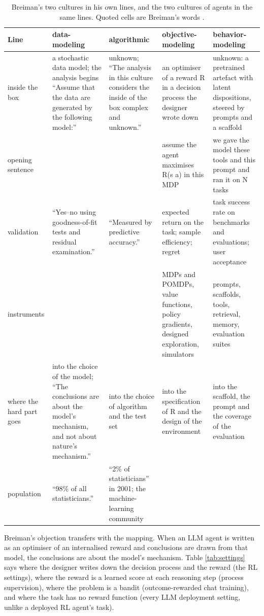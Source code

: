 \documentclass{article}
\begin{document}
\begin{table}[!htb]
\centering\small\setlength{\tabcolsep}{3pt}
\caption{Breiman's two cultures in his own lines, and the two cultures of agents in the same lines. Quoted cells are Breiman's words \citep{breiman2001}.}\label{tab:cultures}
\begin{tabularx}{\textwidth}{@{}>{\raggedright\arraybackslash}X>{\raggedright\arraybackslash}X>{\raggedright\arraybackslash}X>{\raggedright\arraybackslash}X>{\raggedright\arraybackslash}X@{}}
\toprule
Line & data-modeling & algorithmic & objective-modeling & behavior-modeling \\
\midrule
inside the box & a stochastic data model; the analysis begins ``Assume that the data are generated by the following model:'' & unknown; ``The analysis in this culture considers the inside of the box complex and unknown.'' & an optimiser of a reward R in a decision process the designer wrote down & unknown: a pretrained artefact with latent dispositions, steered by prompts and a scaffold \\
opening sentence &  &  & assume the agent maximises R(s a) in this MDP & we gave the model these tools and this prompt and ran it on N tasks \\
validation & ``Yes--no using goodness-of-fit tests and residual examination.'' & ``Measured by predictive accuracy.'' & expected return on the task; sample efficiency; regret & task success rate on benchmarks and evaluations; user acceptance \\
instruments &  &  & MDPs and POMDPs, value functions, policy gradients, designed exploration, simulators & prompts, scaffolds, tools, retrieval, memory, evaluation suites \\
where the hard part goes & into the choice of the model; ``The conclusions are about the model's mechanism, and not about nature's mechanism.'' & into the choice of algorithm and the test set & into the specification of R and the design of the environment & into the scaffold, the prompt and the coverage of the evaluation \\
population & ``98\% of all statisticians.'' & ``2\% of statisticians'' in 2001; the machine-learning community &  &  \\
\bottomrule
\end{tabularx}
\end{table}

Breiman's objection transfers with the mapping. When an LLM agent is written as an optimiser of an internalised reward and conclusions are drawn from that model, the conclusions are about the model's mechanism. Table \ref{tab:settings} says where the designer writes down the decision process and the reward (the RL settings), where the reward is a learned score at each reasoning step (process supervision), where the problem is a bandit (outcome-rewarded chat training), and where the task has no reward function (every LLM deployment setting, unlike a deployed RL agent's task).
\end{document}
